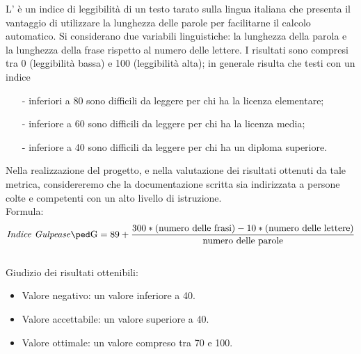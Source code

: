 \documentclass[a4paper, titlepage]{article}
\begin{document}
\newpage
{}
\label{par:IG}
L' è un indice di leggibilità di un testo tarato sulla lingua italiana che presenta il vantaggio di utilizzare la lunghezza delle parole per facilitarne il calcolo automatico. Si considerano due variabili linguistiche: la lunghezza della parola e la lunghezza della frase rispetto al numero delle lettere.
\newline I risultati sono compresi tra 0 (leggibilità bassa) e 100 (leggibilità alta); in generale risulta che testi con un indice
\begin{itemize}
\item[-]inferiori a 80 sono difficili da leggere per chi ha la
licenza elementare;
\item[-]inferiore a 60 sono difficili da leggere per chi ha la
licenza media;
\item[-]inferiore a 40 sono difficili da leggere per chi ha un
diploma superiore.
\end{itemize}
Nella realizzazione del progetto, e nella valutazione dei risultati ottenuti da tale metrica, considereremo che la documentazione scritta sia indirizzata a persone colte e competenti con un alto livello di istruzione.
\\
\newline Formula:
\begin{displaymath}
\mbox{\gl{Indice Gulpease}}= 89+\frac{300*\mbox{(numero delle frasi)}-10*\mbox{(numero delle lettere)}}{\mbox{numero delle parole}}
\end{displaymath}
\\
\newline Giudizio dei risultati ottenibili:
\begin{itemize}
\item Valore negativo: un valore inferiore a 40. 
\item Valore accettabile: un valore superiore a 40.
\item Valore ottimale: un valore compreso tra 70 e 100.
\end{itemize}
\end{document}
